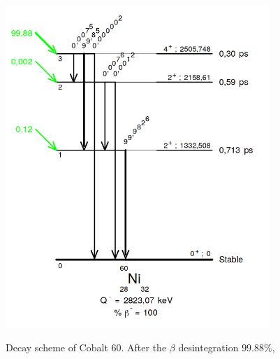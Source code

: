 \begin{figure}
  \centering
  \includegraphics[width=10cm]{CoSource/fig_CoSource/Co_decay_scheme.png}
  \label{fig:Co_decay_scheme}
  \caption{Decay scheme of Cobalt $60$.
  After the $\beta$ desintegration $99.88$\%, }
\end{figure}
